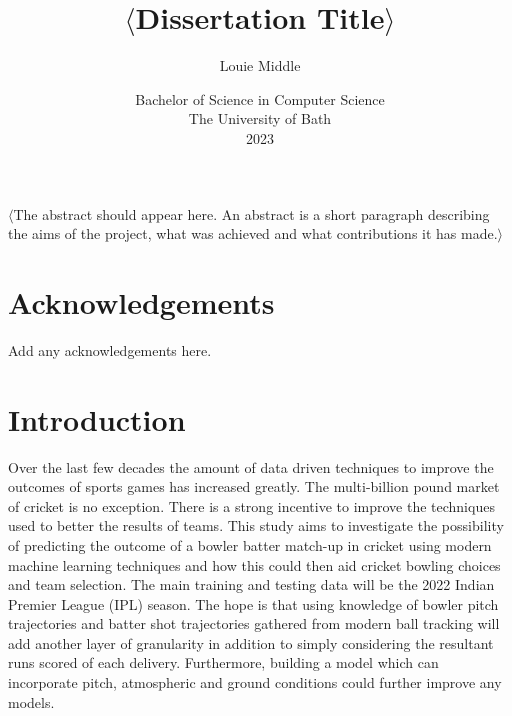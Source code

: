 \documentclass[12pt,a4paper]{report}
\title{\bf $\langle$Dissertation Title$\rangle$}
\author{Louie Middle}
\date{Bachelor of Science in Computer Science\\ 
      The University of Bath\\
      2023}
\begin{document}
\hypersetup{pageanchor=false}

\lstset{language=Java,breaklines,breakatwhitespace,basicstyle=\small}

\setcounter{page}{0}

\maketitle
\newpage

\newpage

\newpage

\hypersetup{pageanchor=true}

\abstract
$\langle$The abstract should appear here. An abstract is a short paragraph describing the aims of the project, what was achieved and what contributions it has made.$\rangle$
\newpage

\tableofcontents
\newpage

\listoffigures
\newpage

\listoftables
\newpage

\chapter*{Acknowledgements}

Add any acknowledgements here.

\newpage
\setcounter{page}{1}

\chapter{Introduction}

Over the last few decades the amount of data driven techniques to improve the outcomes of sports games has increased greatly. The multi-billion pound market of cricket is no exception. There is a strong incentive to improve the techniques used to better the results of teams. This study aims to investigate the possibility of predicting the outcome of a bowler batter match-up in cricket using modern machine learning techniques and how this could then aid cricket bowling choices and team selection. The main training and testing data will be the 2022 Indian Premier League (IPL) season. The hope is that using knowledge of bowler pitch trajectories and batter shot trajectories gathered from modern ball tracking will add another layer of granularity in addition to simply considering the resultant runs scored of each delivery. Furthermore, building a model which can incorporate pitch, atmospheric and ground conditions could further improve any models. 
\end{document}
